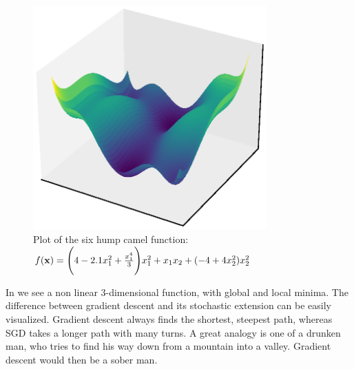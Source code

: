 \begin{figure}[H]
    \label{fig:six-hump-camel-function}
    \centering
    \includegraphics*[width=0.8\textwidth]{./deep-learning/six-hump-camel-function-resized.eps}
    \caption{Plot of the six hump camel function: \( f(\mathbf{x}) = \Bigg( 4 - 2.1 x^{2}_{1} + \frac{x^{4}_{1}}{3} \Bigg) x^{2}_{1} + x_{1}x_{2} + (-4 + 4x^{2}_{2}) x^{2}_{2} \)}
\end{figure}
In  we see a non linear \(3\)-dimensional function, with global and local minima.
The difference between gradient descent and its stochastic extension can be easily visualized.
Gradient descent always finds the shortest, steepest path, whereas SGD takes a longer path with many turns.
A great analogy is one of a drunken man, who tries to find his way down from a mountain into a valley.
Gradient descent would then be a sober man.